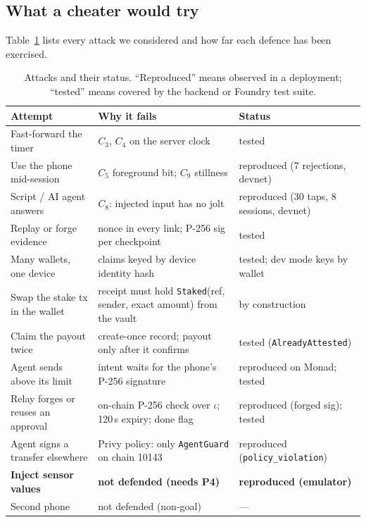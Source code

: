 \documentclass[10pt]{article}
\newcommand{\code}[1]{\texttt{\small #1}}
\begin{document}
\subsection{What a cheater would try}
Table~\ref{tab:attacks} lists every attack we considered and how far each defence has been exercised.
\begin{table}[H]\small
\caption{Attacks and their status. ``Reproduced'' means observed in a deployment; ``tested'' means covered by the
backend or Foundry test suite.}\label{tab:attacks}
\begin{tabularx}{\linewidth}{@{}l X l@{}}\toprule
\textbf{Attempt} & \textbf{Why it fails} & \textbf{Status}\\\midrule
Fast-forward the timer & $C_3$, $C_4$ on the server clock & tested\\
Use the phone mid-session & $C_5$ foreground bit; $C_9$ stillness & reproduced (7 rejections, devnet)\\
Script / AI agent answers & $C_8$: injected input has no jolt & reproduced (30 taps, 8 sessions, devnet)\\
Replay or forge evidence & nonce in every link; P-256 sig per checkpoint & tested\\
Many wallets, one device & claims keyed by device identity hash & tested; dev mode keys by wallet\\
Swap the stake tx in the wallet & receipt must hold \code{Staked}(ref, sender, exact amount) from the vault & by construction\\
Claim the payout twice & create-once record; payout only after it confirms & tested (\code{AlreadyAttested})\\
Agent sends above its limit & intent waits for the phone's P-256 signature & reproduced on Monad; tested\\
Relay forges or reuses an approval & on-chain P-256 check over $\iota$; 120\,s expiry; done flag & reproduced (forged sig); tested\\
Agent signs a transfer elsewhere & Privy policy: only \code{AgentGuard} on chain 10143 & reproduced (\code{policy\_violation})\\
\textbf{Inject sensor values} & \textbf{not defended (needs P4)} & \textbf{reproduced (emulator)}\\
Second phone & not defended (non-goal) & ---\\\bottomrule
\end{tabularx}
\end{table}
\end{document}
